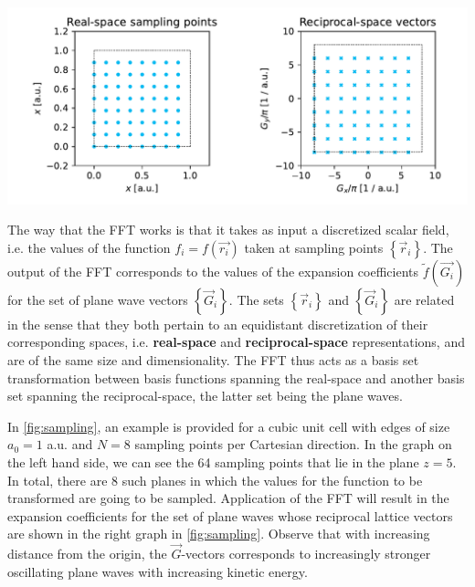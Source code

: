 \begin{Figure}
    \centering
    \includegraphics[width=\linewidth]{img/fig2_sampling.pdf}
    \label{fig:sampling}
\end{Figure}

The way that the FFT works is that it takes as input a discretized scalar field, i.e. the values of the function $f_{i} = f(\vec{r_{i}})$ taken at sampling points $\left\{\vec{r}_{i}\right\}$. The output of the FFT corresponds to the values of the expansion coefficients $\tilde{f}(\vec{G_{i}})$ for the set of plane wave vectors $\left\{ \vec{G}_{i} \right\}$. The sets $\left\{\vec{r}_{i}\right\}$ and $\left\{\vec{G}_{i}\right\}$ are related in the sense that they both pertain to an equidistant discretization of their corresponding spaces, i.e. \textbf{real-space} and \textbf{reciprocal-space} representations, and are of the same size and dimensionality. The FFT thus acts as a basis set transformation between basis functions spanning the real-space and another basis set spanning the reciprocal-space, the latter set being the plane waves.

In \cref{fig:sampling}, an example is provided for a cubic unit cell with edges of size $a_{0} = 1$ a.u. and $N = 8$ sampling points per Cartesian direction. In the graph on the left hand side, we can see the 64 sampling points that lie in the plane $z=5$. In total, there are 8 such planes in which the values for the function to be transformed are going to be sampled. Application of the FFT will result in the expansion coefficients for the set of plane waves whose reciprocal lattice vectors are shown in the right graph in \cref{fig:sampling}. Observe that with increasing distance from the origin, the $\vec{G}$-vectors corresponds to increasingly stronger oscillating plane waves with increasing kinetic energy.

